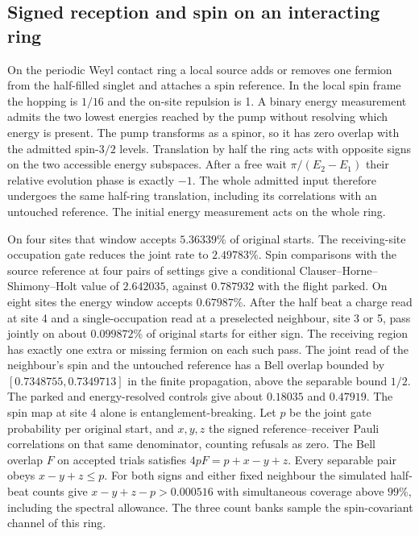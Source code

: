 \subsection{Signed reception and spin on an interacting ring}
\label{sec:signed-spin-receiver}

On the periodic Weyl contact ring a local source adds or removes one
fermion from the half-filled singlet and attaches a spin reference.
In the local spin frame the hopping is \(1/16\) and the on-site
repulsion is 1.
A binary energy measurement admits the two lowest energies reached by
the pump without resolving which energy is present. The pump transforms
as a spinor, so it has zero overlap with the admitted spin-\(3/2\)
levels. Translation by half the ring acts with opposite signs on the
two accessible energy subspaces. After a free wait
\(\pi/(E_2-E_1)\) their relative evolution phase is exactly \(-1\).
The whole admitted input therefore undergoes the same half-ring
translation, including its correlations with an untouched reference.
The initial energy measurement acts on the whole ring.

On four sites that window accepts \(5.36339\%\) of original starts. The
receiving-site occupation gate reduces the joint rate to \(2.49783\%\).
Spin comparisons with the source reference at four pairs of settings
give a conditional Clauser--Horne--Shimony--Holt value of \(2.642035\),
against \(0.787932\) with the flight parked. On eight sites the energy
window accepts \(0.67987\%\). After the half beat a charge read at site
4 and a single-occupation read at a preselected neighbour, site 3 or
5, pass jointly on about \(0.099872\%\) of original starts for either
sign. The receiving region has exactly one extra or missing fermion on
each such pass. The joint read of the neighbour's spin and the
untouched reference has a Bell overlap bounded by
\([0.7348755,0.7349713]\) in the finite propagation, above the
separable bound \(1/2\). The
parked and energy-resolved controls give about \(0.18035\) and
\(0.47919\). The spin map at site 4 alone is entanglement-breaking.
Let \(p\) be the joint gate probability per original start, and
\(x,y,z\) the signed reference--receiver Pauli correlations on that same
denominator, counting refusals as zero. The Bell overlap \(F\) on
accepted trials satisfies \(4pF=p+x-y+z\). Every separable pair obeys
\(x-y+z\leq p\). For both signs and either fixed neighbour the
simulated half-beat counts give \(x-y+z-p>0.000516\) with simultaneous
coverage above \(99\%\), including the spectral allowance. The
three count banks sample the spin-covariant channel of this ring.

